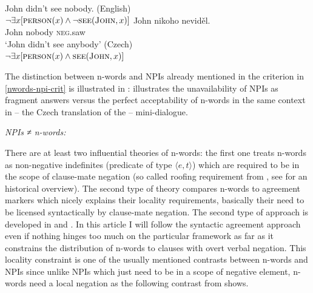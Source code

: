 \documentclass[output=paper,
]{langscibook}
\begin{document}
\ea\label{ex-4} \ea\label{ex-4-a} John didn't see nobody. \hfill (English)\\
$\neg \exists x[\textsc{person}(x) \wedge \neg \textsc{see}(\textsc{John},x)]$
\ex \label{ex-4-b}\gll  John nikoho neviděl.\\
John nobody \textsc{neg}.saw\\
\glt `John didn't see anybody' \hfill (Czech)\\
$\neg \exists x[\textsc{person}(x) \wedge \textsc{see}(\textsc{John},x)]$
\z
\z

\noindent The distinction between n-words and NPIs already mentioned in the criterion in \ref{nwords-npi-crit} is illustrated in :  illustrates the unavailability of NPIs as fragment answers versus the perfect acceptability of n-words in the same context in  -- the Czech translation of the  --  mini-dialogue.

\ea \textit{NPIs ≠ n-words:}\label{ex-5}
\label{ex-5-b}
\z
\z

\noindent There are at least two influential theories of n-words: the first one treats n-words as non-negative indefinites (predicate of type $\langle e,t\rangle$) which are required to be in the scope of clause-mate negation (so called roofing requirement from \cite{ladusaw1992expressing}, see \cite{giannakidou1997landscape} for an historical overview). The second type of theory compares n-words to agreement markers which nicely explains their locality requirements, basically their need to be licensed syntactically by clause-mate negation. The second type of approach is developed in  \cite{zeijlstra2004sentential} and \cite{zeijlstra2008negative}. In this article I will follow the syntactic agreement approach even if nothing hinges too much on the particular framework as far as it constrains the distribution of n-words to clauses with overt verbal negation. This locality constraint is one of the usually mentioned contrasts between n-words and NPIs since unlike  NPIs which just need to be in a scope of negative element, n-words need a local negation as the following contrast from \cite{giannakidou2017landscape} shows.
\end{document}
